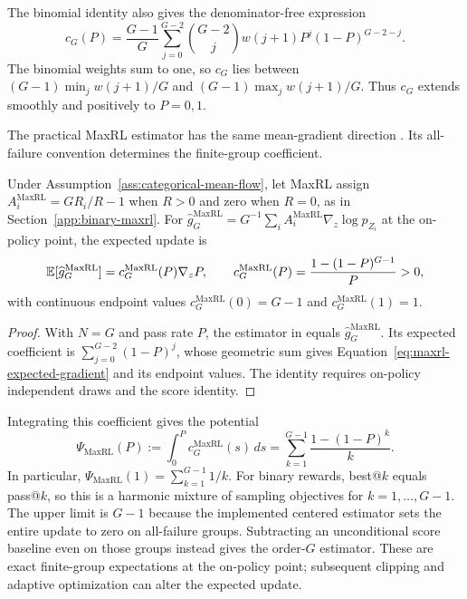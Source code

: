 The binomial identity also gives the denominator-free expression
\[
 c_G(P)=\frac{G-1}{G}\sum_{j=0}^{G-2}\binom{G-2}{j}
 w(j+1)P^j(1-P)^{G-2-j}.
\]
The binomial weights sum to one, so $c_G$ lies between
$(G-1)\min_j w(j+1)/G$ and $(G-1)\max_j w(j+1)/G$.
Thus $c_G$ extends smoothly and positively to $P=0,1$.

The practical MaxRL estimator has the same mean-gradient direction
\citep[Section~4.3 and App.~D, Theorem~5]{tajwar2026maxrl}. Its all-failure
convention determines the finite-group coefficient.

\begin{lemma}
\enforcehalffinalproseline
\label{lem:maxrl-mean}
Under Assumption~\ref{ass:categorical-mean-flow}, let MaxRL assign
$A_i^{\mathrm{MaxRL}}=GR_i/R-1$ when $R>0$ and zero when $R=0$, as in
Section~\ref{app:binary-maxrl}. For
$\widehat g_G^{\mathrm{MaxRL}}=G^{-1}\sum_i
 A_i^{\mathrm{MaxRL}}\nabla_z\log p_{Z_i}$ at the on-policy point, the
expected update is
\begin{equation}
  \mathbb E[\widehat g_G^{\mathrm{MaxRL}}]
  =c_G^{\mathrm{MaxRL}}(P)\nabla_zP,
  \qquad
  c_G^{\mathrm{MaxRL}}(P)
  =\frac{1-(1-P)^{G-1}}{P}>0,
  \label{eq:maxrl-expected-gradient}
\end{equation}
with continuous endpoint values
$c_G^{\mathrm{MaxRL}}(0)=G-1$ and
$c_G^{\mathrm{MaxRL}}(1)=1$.
\end{lemma}

\begin{proof}
\enforcehalffinalproseline
With $N=G$ and pass rate $P$, the estimator in
\citet[Theorem~5]{tajwar2026maxrl} equals
$\widehat g_G^{\mathrm{MaxRL}}$. Its expected coefficient is
$\sum_{j=0}^{G-2}(1-P)^j$, whose geometric sum gives
Equation~\eqref{eq:maxrl-expected-gradient} and its endpoint values.
The identity requires on-policy independent draws and the score identity.
\end{proof}

Integrating this coefficient gives the potential
\begin{equation}
 \Psi_{\mathrm{MaxRL}}(P)
 :=\int_0^P c_G^{\mathrm{MaxRL}}(s)\,ds
 =\sum_{k=1}^{G-1}\frac{1-(1-P)^k}{k}.
 \label{eq:maxrl-potential-finite-sum}
\end{equation}
In particular, $\Psi_{\mathrm{MaxRL}}(1)=\sum_{k=1}^{G-1}1/k$.
For binary rewards, best@\(k\) equals pass@\(k\), so this is a harmonic
mixture of sampling objectives for $k=1,\ldots,G-1$. The upper limit is
$G-1$ because the implemented centered estimator sets the entire update
to zero on all-failure groups. Subtracting an unconditional score baseline
even on those groups instead gives the order-$G$ estimator. These are exact
finite-group expectations at the on-policy point; subsequent clipping and
adaptive optimization can alter the expected update.

